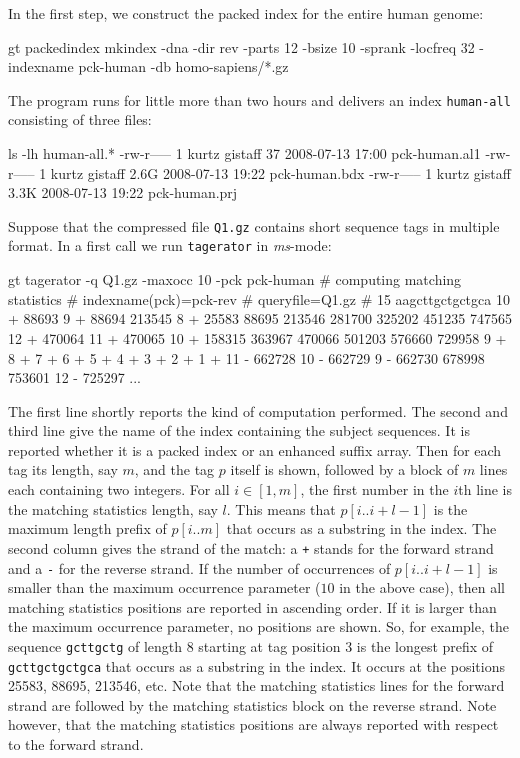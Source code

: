 \documentclass[12pt]{article}
\newcommand{\Substring}[3]{#1[#2..#3]}
\newcommand{\Program}[0]{\texttt{tagerator}\xspace}
\begin{document}
In the first step, we construct the packed index for the entire human genome:

\begin{Output}
gt packedindex mkindex -dna -dir rev -parts 12 -bsize 10 -sprank -locfreq 32
                       -indexname pck-human -db homo-sapiens/*.gz
\end{Output}

The program runs for little more than two hours and delivers 
an index \texttt{human-all} consisting of three files:

\begin{Output}
ls -lh human-all.*
-rw-r----- 1 kurtz gistaff   37 2008-07-13 17:00 pck-human.al1
-rw-r----- 1 kurtz gistaff 2.6G 2008-07-13 19:22 pck-human.bdx
-rw-r----- 1 kurtz gistaff 3.3K 2008-07-13 19:22 pck-human.prj
\end{Output}

Suppose that the compressed file \texttt{Q1.gz} contains short sequence tags
in multiple \Fasta format. In a first call we run \Program in \textit{ms}-mode:

\begin{Output}
gt tagerator -q Q1.gz -maxocc 10 -pck pck-human
# computing matching statistics
# indexname(pck)=pck-rev
# queryfile=Q1.gz
# 15 aagcttgctgctgca
10 + 88693
9 + 88694 213545
8 + 25583 88695 213546 281700 325202 451235 747565
12 + 470064
11 + 470065
10 + 158315 363967 470066 501203 576660 729958
9 +
8 +
7 +
6 +
5 +
4 +
3 +
2 +
1 +
11 - 662728
10 - 662729
9 - 662730 678998 753601
12 - 725297
...
\end{Output}
The first line shortly reports the kind of computation performed. The second
and third line give the name of the index containing the subject sequences.
It is reported whether it is a packed index or an enhanced suffix array. 
Then for
each tag its length, say \(m\), and the tag \(p\) itself is shown, followed by 
a block of \(m\) lines each containing two integers. For all \(i\in[1,m]\), 
the first number in the \(i\)th line is the matching statistics length, say
\(l\). This means that \(\Substring{p}{i}{i+l-1}\) is the maximum length prefix
of \(\Substring{p}{i}{m}\) that occurs as a substring in the index.  The
second column gives the strand of the match: a \texttt{+} stands for the
forward strand and a \texttt{-} for the reverse strand.
If the number of occurrences of \(\Substring{p}{i}{i+l-1}\) is smaller than 
the maximum
occurrence parameter (\(10\) in the above case), then all matching statistics 
positions are reported in ascending order. If it is larger than the maximum
occurrence parameter, no positions are shown.
So, for example, the sequence \texttt{gcttgctg} of length 8 starting at tag
position 3 is the longest prefix of \texttt{gcttgctgctgca} that occurs as 
a substring in the index. It occurs at the positions 25583, 88695, 213546,
etc. Note that the matching statistics lines for the forward strand are
followed by the matching statistics block on the reverse strand. Note however,
that the matching statistics positions are always reported with respect to the
forward strand.
\end{document}
